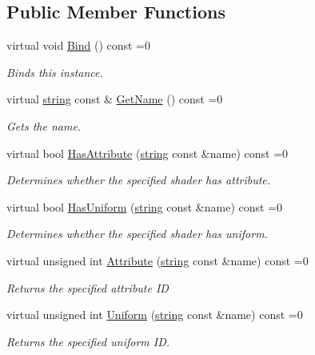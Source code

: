 \subsection*{Public Member Functions}
\begin{DoxyCompactItemize}
\item 
virtual void \hyperlink{class_i_shader_a6e05ab27d01c6007eeda7f72373fb8d5}{Bind} () const  =0
\begin{DoxyCompactList}\small\item\em Binds this instance. \end{DoxyCompactList}\item 
virtual \hyperlink{_types_8h_ad453f9f71ce1f9153fb748d6bb25e454}{string} const \& \hyperlink{class_i_shader_a66aa452cc047db6caa2a8292e55fdc5a}{Get\+Name} () const  =0
\begin{DoxyCompactList}\small\item\em Gets the name. \end{DoxyCompactList}\item 
virtual bool \hyperlink{class_i_shader_a24829a03d1f1900c1a4f6d9b811c73e1}{Has\+Attribute} (\hyperlink{_types_8h_ad453f9f71ce1f9153fb748d6bb25e454}{string} const \&name) const  =0
\begin{DoxyCompactList}\small\item\em Determines whether the specified shader has attribute. \end{DoxyCompactList}\item 
virtual bool \hyperlink{class_i_shader_af2bae76c50e2b480e113a51352c2f363}{Has\+Uniform} (\hyperlink{_types_8h_ad453f9f71ce1f9153fb748d6bb25e454}{string} const \&name) const  =0
\begin{DoxyCompactList}\small\item\em Determines whether the specified shader has uniform. \end{DoxyCompactList}\item 
virtual unsigned int \hyperlink{class_i_shader_a74f90be36719756e5e0f20c5998b81ff}{Attribute} (\hyperlink{_types_8h_ad453f9f71ce1f9153fb748d6bb25e454}{string} const \&name) const  =0
\begin{DoxyCompactList}\small\item\em Returns the specified attribute ID \end{DoxyCompactList}\item 
virtual unsigned int \hyperlink{class_i_shader_a3a5bc195867e0e928447a772b41c21bf}{Uniform} (\hyperlink{_types_8h_ad453f9f71ce1f9153fb748d6bb25e454}{string} const \&name) const  =0
\begin{DoxyCompactList}\small\item\em Returns the specified uniform ID. \end{DoxyCompactList}\item 

\end{DoxyCompactItemize}
